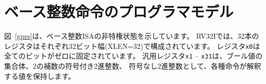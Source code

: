 \begin{comment}
\multicolumn{1}{|c|}{\reglabel{\ \ \ x20\ \ \ \ \ }}        \\ \cline{1-1}
\multicolumn{1}{|c|}{\reglabel{\ \ \ x21\ \ \ \ \ }}        \\ \cline{1-1}
\multicolumn{1}{|c|}{\reglabel{\ \ \ x22\ \ \ \ \ }}        \\ \cline{1-1}
\multicolumn{1}{|c|}{\reglabel{\ \ \ x23\ \ \ \ \ }}        \\ \cline{1-1}
\multicolumn{1}{|c|}{\reglabel{\ \ \ x24\ \ \ \ \ }}        \\ \cline{1-1}
\multicolumn{1}{|c|}{\reglabel{\ \ \ x25\ \ \ \ \ }}        \\ \cline{1-1}
\multicolumn{1}{|c|}{\reglabel{\ \ \ x26\ \ \ \ \ }}        \\ \cline{1-1}
\multicolumn{1}{|c|}{\reglabel{\ \ \ x27\ \ \ \ \ }}        \\ \cline{1-1}
\multicolumn{1}{|c|}{\reglabel{\ \ \ x28\ \ \ \ \ }}        \\ \cline{1-1}
\multicolumn{1}{|c|}{\reglabel{\ \ \ x29\ \ \ \ \ }}        \\ \cline{1-1}
\multicolumn{1}{|c|}{\reglabel{\ \ \ x30\ \ \ \ \ }}        \\ \cline{1-1}
\multicolumn{1}{|c|}{\reglabel{\ \ \ x31\ \ \ \ \ }}        \\ \cline{1-1}
\multicolumn{1}{c}{XLEN}                                  \\

\instbitrange{XLEN-1}{0}                                  \\ \cline{1-1}
\multicolumn{1}{|c|}{\reglabel{pc}}                         \\ \cline{1-1}
\multicolumn{1}{c}{XLEN}                                  \\
\end{tabular}
\end{center}
}
\caption{RISC-V base unprivileged integer register state.}
\label{gprs}
\end{figure}
\end{comment}

\section{ベース整数命令のプログラマモデル}

図~\ref{gprs}は、ベース整数ISAの非特権状態を示しています。
RV32Iでは、32本のレジスタはそれぞれ32ビット幅(XLEN=32)で構成されています。
レジスタ{\tt x0}は全てのビットがゼロに固定されています。
汎用レジスタ{\tt x1} -- {\tt x31}は、ブール値の集合体、2の補数の符号付き2進整数、
符号なし2進整数として、各種命令が解釈する値を保持します。

